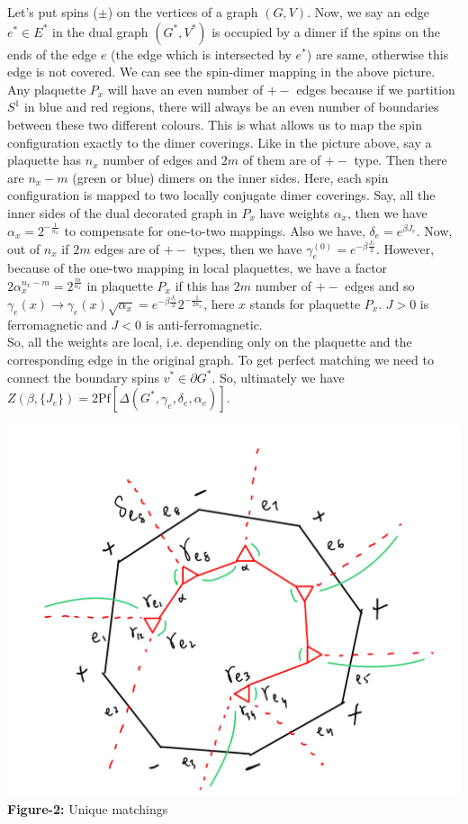 \documentclass{article}
\begin{document}
	Let's put spins ($\pm$) on the vertices of a graph $(G,V)$. Now, we say an edge $e^* \in E^*$ in the dual graph $(G^*, V^*)$ is occupied by a dimer if the spins on the ends of the edge $e$ (the edge which is intersected by $e^*$) are same, otherwise this edge is not covered. We can see the spin-dimer mapping in the above picture. Any plaquette $P_x$ will have an even number of $+-$ edges because if we partition $S^1$ in blue and red regions, there will always be an even number of boundaries between these two different colours. This is what allows us to map the spin configuration exactly to the dimer coverings. Like in the picture above, say a plaquette has $n_x$ number of edges and $2m$ of them are of $+-$ type. Then there are $n_x-m$ (green or blue) dimers on the inner sides. Here, each spin configuration is mapped to two locally conjugate dimer coverings. Say, all the inner sides of the dual decorated graph in $P_x$ have weights $\alpha_x$, then we have $\alpha_x=2^{-\frac{1}{n_x}}$ to compensate for one-to-two mappings. Also we have, $\delta_e=e^{\beta J_e}$. Now, out of $n_x$ if $2m$ edges are of $+-$ types, then we have $\gamma^{(0)}_e=e^{-\beta\frac{J_e}{2}}$. However, because of the one-two mapping in local plaquettes, we have a factor $2\alpha_x^{n_x-m}=2^{\frac{m}{n_x}}$ in plaquette $P_x$ if this has $2m$ number of $+-$ edges and so $\gamma_e(x) \rightarrow \gamma_e(x)\sqrt{\alpha_x}=e^{-\beta \frac{J_e}{2}}2^{-\frac{1}{2n_x}}$, here $x$ stands for plaquette $P_x$. $J>0$ is ferromagnetic and $J<0$ is anti-ferromagnetic.\\
	
	
	So, all the weights are local, i.e. depending only on the plaquette and the corresponding edge in the original graph. To get perfect matching we need to connect the boundary spins $v^* \in \partial G^*$. So, ultimately we have $Z(\beta , \{J_e\})=2\text{Pf}[\Delta(G^*, \gamma_e, \delta_e, \alpha_e)]$. \\
	
	
	\begin{center}
		\includegraphics[scale=0.16]{Unique configuration.jpg}\\
		\textbf{Figure-2:} Unique matchings \\
	\end{center}
	
\end{document}
